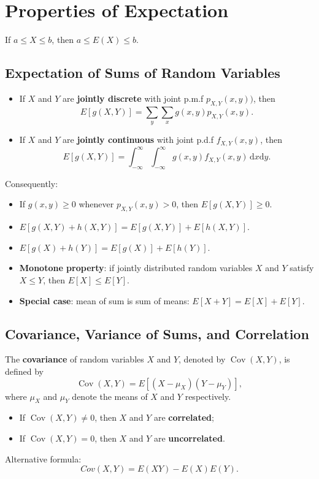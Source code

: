\section{Properties of Expectation}

If \(a \leq X \leq b\), then \(a \leq E(X) \leq b\).

\subsection{Expectation of Sums of Random Variables}

\begin{itemize}
  \item If \(X\) and \(Y\) are \textbf{jointly discrete} with joint p.m.f
    \(p_{X,Y}(x,y))\), then \[E[g(X, Y)] = \sum_y\sum_xg(x,y)p_{X,Y}(x,y).\]
  \item If \(X\) and \(Y\) are \textbf{jointly continuous} with joint p.d.f 
    \(f_{X,Y}(x,y)\), then \[E[g(X, Y)] =
    \int_{-\infty}^{\infty}\int_{-\infty}^{\infty}g(x,y)f_{X,Y}(x,y)
  \,\mathrm{d}x\mathrm{d}y.\]
\end{itemize}
Consequently:
\begin{itemize}
  \item If \(g(x,y)\geq 0\) whenever \(p_{X,Y}(x,y) > 0\), then \(E[g(X, Y)]
    \geq 0\).
  \item \(E[g(X, Y) + h(X,Y)] = E[g(X, Y)] + E[h(X,Y)]\).
  \item \(E[g(X) + h(Y)] = E[g(X)] + E[h(Y)]\).
  \item \textbf{Monotone property}: if jointly distributed random variables
    \(X\) and \(Y\) satisfy \(X \leq Y\), then \(E[X] \leq E[Y]\).
  \item \textbf{Special case}: mean of sum is sum of means: \(E[X + Y] = E[X]
    + E[Y]\).
\end{itemize}

\subsection{Covariance, Variance of Sums, and Correlation}

 The \textbf{covariance} of random variables \(X\) and
\(Y\), denoted by \(\operatorname{Cov}\left(X,Y\right)\), is defined by 
\[\operatorname{Cov}\left(X,Y\right)= E[(X-\mu_X)(Y-\mu_Y)],\]
where \(\mu_X\) and \(\mu_Y\) denote the means of \(X\) and \(Y\) respectively.
\begin{itemize}
  \item If \(\operatorname{Cov}\left(X,Y\right)\neq 0\), then \(X\) and \(Y\)
    are \textbf{correlated};
  \item If \(\operatorname{Cov}\left(X,Y\right)= 0\), then \(X\) and \(Y\) are
    \textbf{uncorrelated}.
\end{itemize}
Alternative formula:
\[Cov(X, Y) = E(XY) - E(X)E(Y).\]

